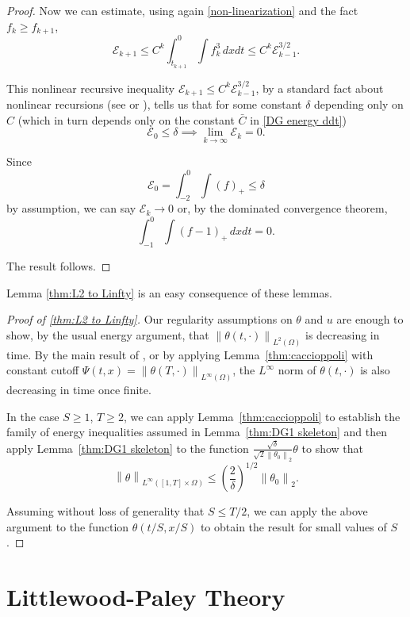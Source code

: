 \documentclass[11pt]{amsart}
\theoremstyle{remark}
\theoremstyle{definition}
\newcommand{\E}{\mathcal{E}}
\newcommand{\norm}[1]{\left\lVert#1\right\rVert}
\newcommand{\paren}[1]{\left( #1 \right)}
\begin{document}
\begin{proof}
Now we can estimate, using again \eqref{non-linearization} and the fact $f_k \geq f_{k+1}$,
\[ \E_{k+1} \leq C^k \int_{t_{k+1}}^0 \int f_k^3 \,dxdt \leq C^k \E_{k-1}^{3/2}. \]

This nonlinear recursive inequality $\E_{k+1} \leq C^k \E_{k-1}^{3/2}$, by a standard fact about nonlinear recursions (see \cite{DG} or \cite{Va.dg}), tells us that for some constant $\delta$ depending only on $C$ (which in turn depends only on the constant $\bar{C}$ in \eqref{DG energy ddt})
\[ \E_0 \leq \delta \implies \lim_{k \to \infty} \E_k = 0. \]

Since
\[ \E_0 = \int_{-2}^0 \int (f)_+ \leq \delta \]
by assumption, we can say $\E_k \to 0$ or, by the dominated convergence theorem,
\[ \int_{-1}^0 \int (f-1)_+ \,dxdt = 0. \]

The result follows.  
\end{proof}


Lemma \ref{thm:L2 to Linfty} is an easy consequence of these lemmas.  

\begin{proof}[Proof of \ref{thm:L2 to Linfty}]
Our regularity assumptions on $\theta$ and $u$ are enough to show, by the usual energy argument, that $\norm{\theta(t,\cdot)}_{L^2(\Omega)}$ is decreasing in time.  By the main result of \cite{CoIg.sqg}, or by applying Lemma~\ref{thm:caccioppoli} with constant cutoff $\Psi(t,x) = \norm{\theta(T,\cdot)}_{L^\infty(\Omega)}$, the $L^\infty$ norm of $\theta(t,\cdot)$ is also decreasing in time once finite.  

In the case $S \geq 1$, $T \geq 2$, we can apply Lemma~\ref{thm:caccioppoli} to establish the family of energy inequalities assumed in Lemma~\ref{thm:DG1 skeleton} and then apply Lemma~\ref{thm:DG1 skeleton} to the function $\frac{\sqrt{\delta}}{\sqrt{2} \norm{\theta_0}_2} \theta$ to show that 
\[ \norm{\theta}_{L^\infty([1,T]\times\Omega)} \leq \paren{\frac{2}{\delta}}^{1/2} \norm{\theta_0}_2. \]

Assuming without loss of generality that $S \leq T/2$, we can apply the above argument to the function $\theta(t/S, x/S)$ to obtain the result for small values of $S$.  
\end{proof}



\section{Littlewood-Paley Theory} \label{sec:littlewood paley}
\end{document}
